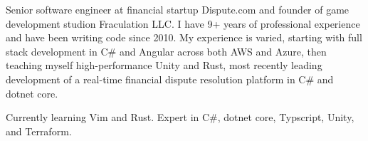 

\begin{cvparagraph}

Senior software engineer at financial startup Dispute.com and founder of game development studion Fraculation LLC.\@
I have 9+ years of professional experience and have been writing code since 2010. My experience is varied, starting with 
full stack development in C\# and Angular across both AWS and Azure, then teaching myself high-performance Unity and Rust,
most recently leading development of a real-time financial dispute resolution platform in C\# and dotnet core.

Currently learning Vim and Rust. Expert in C\#, dotnet core, Typscript, Unity, and Terraform.

\end{cvparagraph}
